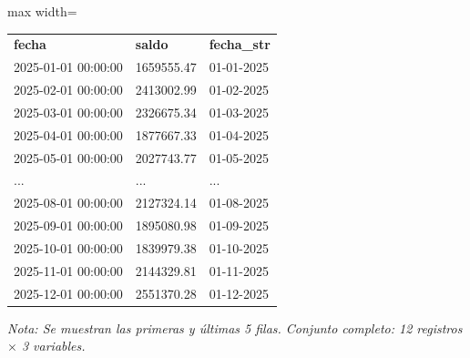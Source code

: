 

\begin{table}[htbp]

\centering

\begin{adjustbox}{max width=\textwidth}

\begin{tabular}{lll}

\rowcolor{ThemeBackground}
\rule{0pt}{0.45cm}
\textcolor{ThemeGold}{\bfseries fecha} & \textcolor{ThemeGold}{\bfseries saldo} & \textcolor{ThemeGold}{\bfseries fecha\_str} \\

2025-01-01 00:00:00 & 1659555.47 & 01-01-2025 \\
2025-02-01 00:00:00 & 2413002.99 & 01-02-2025 \\
2025-03-01 00:00:00 & 2326675.34 & 01-03-2025 \\
2025-04-01 00:00:00 & 1877667.33 & 01-04-2025 \\
2025-05-01 00:00:00 & 2027743.77 & 01-05-2025 \\
... & ... & ... \\
2025-08-01 00:00:00 & 2127324.14 & 01-08-2025 \\
2025-09-01 00:00:00 & 1895080.98 & 01-09-2025 \\
2025-10-01 00:00:00 & 1839979.38 & 01-10-2025 \\
2025-11-01 00:00:00 & 2144329.81 & 01-11-2025 \\
2025-12-01 00:00:00 & 2551370.28 & 01-12-2025 \\
\bottomrule
\end{tabular}

\end{adjustbox}

\vspace{0.15cm}
{\raggedright\sffamily\footnotesize\color{ThemeMuted}
\textit{Nota: Se muestran las primeras y últimas 5 filas. Conjunto completo: 12 registros $\times$ 3 variables.}}

\end{table}
